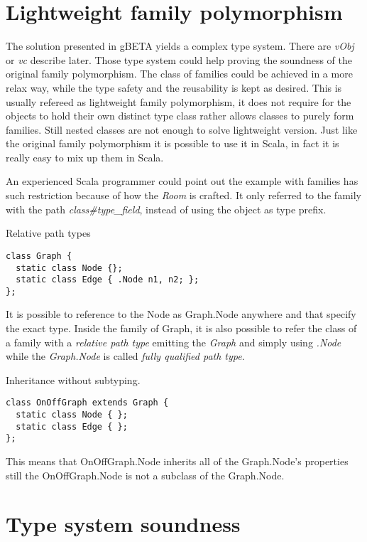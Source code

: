 \documentclass[a4paper, 10pt, conference ]{llncs}
\begin{document}
\section{Lightweight family polymorphism}

The solution presented in gBETA yields a complex type system. There are \emph{vObj} or \emph{vc} describe later. Those type system could help proving the soundness of the original family polymorphism. The class of families could be achieved in a more relax way, while the type safety and the reusability is kept as desired. This is usually refereed as lightweight family polymorphism, it does not require for the objects to hold their own distinct type class rather allows classes to purely form families. Still nested classes are not enough to solve lightweight version. Just like the original family polymorphism it is possible to use it in Scala, in fact it is really easy to mix up them in Scala.

An experienced Scala programmer could point out the example with families has such restriction because of how the \emph{Room} is crafted. It only referred to the family with the path \emph{class\#type\_field}, instead of using the object as type prefix.

Relative path types

\begin{verbatim}
class Graph {
  static class Node {};
  static class Edge { .Node n1, n2; };
};
\end{verbatim}

It is possible to reference to the Node as Graph.Node anywhere and that specify the exact type. Inside the family of Graph, it is also possible to refer the class of a family with a \emph{relative path type} emitting the \emph{Graph} and simply using \emph{.Node} while the \emph{Graph.Node} is called \emph{fully qualified path type}.

Inheritance without subtyping.

\begin{verbatim}
class OnOffGraph extends Graph {
  static class Node { };
  static class Edge { };
};
\end{verbatim}

This means that OnOffGraph.Node inherits all of the Graph.Node's properties still the OnOffGraph.Node is not a subclass of the Graph.Node.

\section{Type system soundness}
\end{document}
